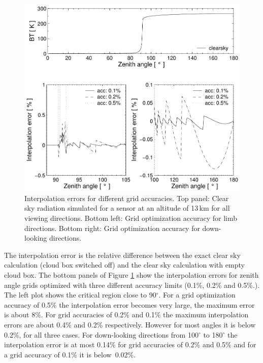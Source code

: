 \begin{figure}[t]
\centering
  \includegraphics[width=.9\hsize]{grid_acc}
  \caption{Interpolation errors for different grid accuracies.
    Top panel: Clear sky radiation simulated for a sensor at an altitude of
    13\,km for all viewing directions.
    Bottom left: Grid optimization accuracy for limb directions.
    Bottom right: Grid optimization accuracy for down-looking
    directions.}
  \label{fig:scattering:grid_acc}  
\end{figure}

The interpolation error is the relative difference between the exact
clear sky calculation (cloud box switched off) and the clear sky
calculation with empty cloud box.  The bottom panels of
Figure \ref{fig:scattering:grid_acc} show the interpolation errors for zenith
angle grids optimized with three different accuracy limits (0.1\%,
0.2\% and 0.5\%.). The left plot shows the critical region close to
90$^\circ$.  For a grid optimization accuracy of 0.5\% the
interpolation error becomes very large, the maximum error is 
about 8\%. For grid accuracies of 0.2\% and 0.1\% the maximum
interpolation errors are about 0.4\% and 0.2\% respectively. However
for most angles it is below 0.2\%, for all three cases. For
down-looking directions from 100$^\circ$ to 180$^\circ$ the
interpolation error is at most 0.14\% for grid accuracies of 0.2\% and 0.5\%
and for a grid accuracy of 0.1\% it is below~0.02\%. 


